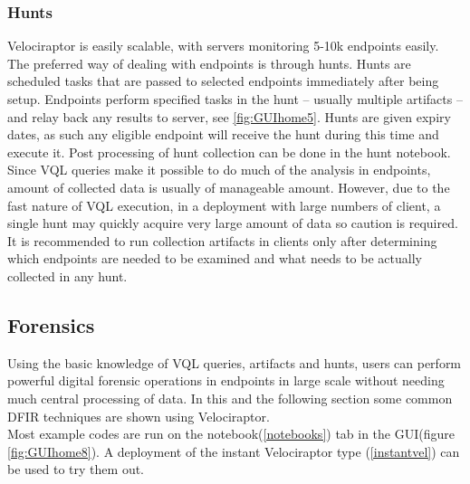 \documentclass[a4paper, 11pt, oneside]{article} %
\begin{document}
\subsubsection{Hunts}
Velociraptor is easily scalable, with servers monitoring 5-10k endpoints easily. The preferred way of dealing with endpoints is through hunts. Hunts are scheduled tasks that are passed to selected endpoints immediately after being setup. Endpoints perform specified tasks in the hunt -- usually multiple artifacts -- and relay back any results to server, see \ref{fig:GUIhome5}. Hunts are given expiry dates, as such any eligible endpoint will receive the hunt during this time and execute it. Post processing of hunt collection can be done in the hunt notebook.
\\
Since VQL queries make it possible to do much of the analysis in endpoints, amount of collected data is usually of manageable amount. However, due to the fast nature of VQL execution, in a deployment with large numbers of client, a single hunt may quickly acquire very large amount of data so caution is required. It is recommended to run collection artifacts in clients only after determining which endpoints are needed to be examined and what needs to be actually collected in any hunt. 

\subsection{Forensics}
Using the basic knowledge of VQL queries, artifacts and hunts, users can perform powerful digital forensic operations in endpoints in large scale without needing much central processing of data. In this and the following section some common DFIR techniques are shown using Velociraptor.
\\
Most example codes are run on the notebook(\ref{notebooks}) tab in the GUI(figure \ref{fig:GUIhome8}). A deployment of the instant Velociraptor type (\ref{instantvel}) can be used to try them out.
\end{document}
